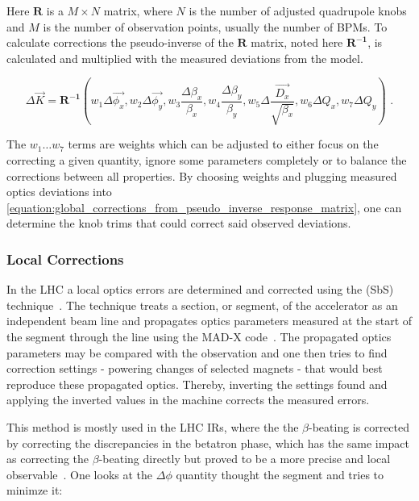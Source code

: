 Here \(\mathbf{R}\) is a \(M \times N\) matrix, where \(N\) is the number of adjusted quadrupole knobs and \(M\) is the number of observation points, usually the number of BPMs.
To calculate corrections the pseudo-inverse of the \(\mathbf{R}\) matrix, noted here \(\mathbf{R^{-1}}\), is calculated and multiplied with the measured deviations from the model.

\begin{equation}
  \Delta \vec{K} = \mathbf{R^{-1}} \left(w_1 \Delta \overrightarrow{\phi_x}, w_2 \Delta \overrightarrow{\phi_y}, w_3 \frac{\Delta \beta_x}{\beta_x}, w_4 \frac{\Delta \beta_y}{\beta_y}, w_5 \Delta \frac{\overrightarrow{D_x}}{\sqrt{\beta_x}}, w_6 \Delta Q_x, w_7 \Delta Q_y \right) \text{ .}
  \label{equation:global_corrections_from_pseudo_inverse_response_matrix}
\end{equation}

The \(w_1 \ldots w_7\) terms are weights which can be adjusted to either focus on the correcting a given quantity, ignore some parameters completely or to balance the corrections between all properties.
By choosing weights and plugging measured optics deviations into \cref{equation:global_corrections_from_pseudo_inverse_response_matrix}, one can determine the knob trims that could correct said observed deviations.

\subsubsection*{Local Corrections}

In the LHC a local optics errors are determined and corrected using the  (SbS) technique~\cite{PRAB:Tomas:CERN_LHC_OMC,PRAB:Tomas:Review_Linear_Optics_Measurements}.
The technique treats a section, or segment, of the accelerator as an independent beam line and propagates optics parameters measured at the start of the segment through the line using the MAD-X code~\cite{CODE:MADX_guide}.
The propagated optics parameters may be compared with the observation and one then tries to find correction settings - powering changes of selected magnets - that would best reproduce these propagated optics.
Thereby, inverting the settings found and applying the inverted values in the machine corrects the measured errors.

This method is mostly used in the LHC IRs, where the the \(\beta\)-beating is corrected by correcting the discrepancies in the betatron phase, which has the same impact as correcting the \(\beta\)-beating directly but proved to be a more precise and local observable~\cite{PRAB:Tomas:CERN_LHC_OMC}.
One looks at the \(\Delta \phi\) quantity thought the segment and tries to minimze it:


